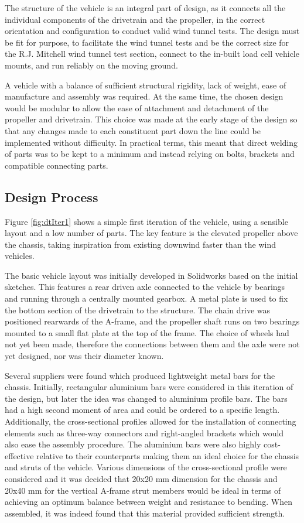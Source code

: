 The structure of the vehicle is an integral part of design, as it connects all the individual components of the drivetrain and the propeller, in the correct orientation and configuration to conduct valid wind tunnel tests. The design must be fit for purpose, to facilitate the wind tunnel tests and be the correct size for the R.J. Mitchell wind tunnel test section, connect to the in-built load cell vehicle mounts, and run reliably on the moving ground.


A vehicle with a balance of sufficient structural rigidity, lack of weight, ease of manufacture and assembly was required. At the same time, the chosen design would be modular to allow the ease of attachment and detachment of the propeller and drivetrain. This choice was made at the early stage of the design so that any changes made to each constituent part down the line could be implemented without difficulty. In practical terms, this meant that direct welding of parts was to be kept to a minimum and instead relying on bolts, brackets and compatible connecting parts.

\subsection{Design Process}

Figure \ref{fig:dtIter1} shows a simple first iteration of the vehicle, using a sensible layout and a low number of parts. The key feature is the elevated propeller above the chassis, taking inspiration from existing downwind faster than the wind vehicles.

The basic vehicle layout was initially developed in Solidworks based on the initial sketches. This features a rear driven axle connected to the vehicle by bearings and running through a centrally mounted gearbox. A metal plate is used to fix the bottom section of the drivetrain to the structure. The chain drive was positioned rearwards of the A-frame, and the propeller shaft runs on two bearings mounted to a small flat plate at the top of the frame. The choice of wheels had not yet been made, therefore the connections between them and the axle were not yet designed, nor was their diameter known.

Several suppliers were found which produced lightweight metal bars for the chassis. Initially, rectangular aluminium bars were considered in this iteration of the design, but later the idea was changed to aluminium profile bars. The bars had a high second moment of area and could be ordered to a specific length. Additionally, the cross-sectional profiles allowed for the installation of connecting elements such as three-way connectors and right-angled brackets which would also ease the assembly procedure. The aluminium bars were also highly cost-effective relative to their counterparts making them an ideal choice for the chassis and struts of the vehicle. Various dimensions of the cross-sectional profile were considered and it was decided that 20x20 mm dimension for the chassis and 20x40 mm for the vertical A-frame strut members would be ideal in terms of achieving an optimum balance between weight and resistance to bending. When assembled, it was indeed found that this material provided sufficient strength.


